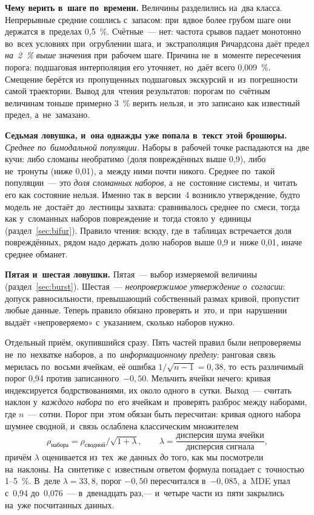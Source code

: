 \documentclass[11pt,a4paper,landscape,twocolumn]{article}
\begin{document}
\textbf{Чему верить в~шаге по~времени.} Величины разделились на~два класса. Непрерывные средние сошлись с~запасом: при~вдвое более грубом шаге они держатся в~пределах 0,5~\%. Счётные~— нет: частота срывов падает монотонно во~всех условиях при~огрублении шага, и~экстраполяция Ричардсона даёт предел \emph{на~2~\% выше} значения при~рабочем шаге. Причина не~в~моменте пересечения порога: подшаговая интерполяция его уточняет, но~даёт всего 0,009~\%. Смещение берётся из~пропущенных подшаговых экскурсий и~из~погрешности самой траектории. Вывод для~чтения результатов: порогам по~счётным величинам тоньше примерно 3~\% верить нельзя, и~это записано как известный предел, а~не~замазано.

\textbf{Седьмая ловушка, и~она однажды уже попала в~текст этой брошюры.} \emph{Среднее по~бимодальной популяции.} Наборы в~рабочей точке распадаются на~две кучи: либо сломаны необратимо (доля повреждённых выше 0,9), либо не~тронуты (ниже 0,01), а~между ними почти никого. Среднее по~такой популяции~— это \emph{доля сломанных наборов}, а~не~состояние системы, и~читать его как состояние нельзя. Именно так в~версии~4 возникло утверждение, будто модель не~достаёт до~лестницы захвата: сравнивалось среднее по~смеси, тогда как у~сломанных наборов повреждение и~тогда стояло у~единицы (раздел~\ref{sec:bifur}). Правило чтения: всюду, где в~таблицах встречается доля повреждённых, рядом надо держать долю наборов выше 0,9 и~ниже 0,01, иначе среднее обманет.

\textbf{Пятая и~шестая ловушки.} Пятая~— выбор измеряемой величины (раздел~\ref{sec:burst}). Шестая~— \emph{неопровержимое утверждение о~согласии}: допуск равносильности, превышающий собственный размах кривой, пропустит любые данные. Теперь правило обязано проверять и~это, и~при~нарушении выдаёт «непроверяемо» с~указанием, сколько наборов нужно.

\begin{ineq}
Отдельный приём, окупившийся сразу. Пять частей правил были непроверяемы не~по~нехватке наборов, а~по~\emph{информационному пределу}: ранговая связь мерилась по~восьми ячейкам, её ошибка $1/\sqrt{n-1}=0{,}38$, то~есть различимый порог 0,94 против записанного~$-0{,}50$. Мельчить ячейки нечего: кривая индексируется бодрствованиями, их около одного в~сутки. Выход~— считать наклон у~\emph{каждого набора} по~его ячейкам и~проверять разброс между наборами, где $n$~— сотни. Порог при~этом обязан быть пересчитан: кривая одного набора шумнее сводной, и~связь ослаблена классическим множителем
\[\rho_{\text{набора}}=\rho_{\text{сводной}}\big/\sqrt{1+\lambda},\qquad \lambda=\frac{\text{дисперсия шума ячейки}}{\text{дисперсия сигнала}},\]
причём $\lambda$ оценивается из~тех~же данных \emph{до} того, как мы посмотрели на~наклоны. На~синтетике с~известным ответом формула попадает с~точностью 1–5~\%. В~деле $\lambda=33{,}8$, порог $-0{,}50$ пересчитался в~$-0{,}085$, а~MDE упал с~0,94 до~0,076~— в~двенадцать раз,— и~четыре части из~пяти закрылись на~уже посчитанных данных.
\end{ineq}
\end{document}
